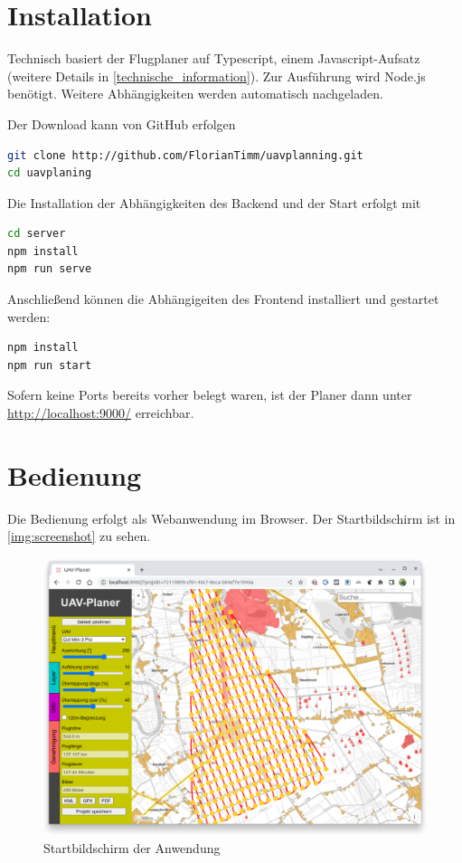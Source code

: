 \documentclass[a4paper,12pt,bibliography=totoc, listof=totoc,titlepage]{scrartcl}
\begin{document}
\section{Installation}
Technisch basiert der Flugplaner auf Typescript, einem Javascript-Aufsatz (weitere Details in \autoref{technische_information}). Zur Ausführung wird Node.js benötigt. Weitere Abhängigkeiten werden automatisch nachgeladen.

Der Download kann von GitHub erfolgen
\begin{lstlisting}[language=bash]
git clone http://github.com/FlorianTimm/uavplanning.git
cd uavplaning
\end{lstlisting}

Die Installation der Abhängigkeiten des Backend und der Start erfolgt mit
\begin{lstlisting}[language=bash]
cd server
npm install
npm run serve
\end{lstlisting}

Anschließend können die Abhängigeiten des Frontend installiert und gestartet werden:
\begin{lstlisting}[language=bash]
npm install
npm run start
\end{lstlisting}

Sofern keine Ports bereits vorher belegt waren, ist der Planer dann unter \url{http://localhost:9000/} erreichbar.

\section{Bedienung}

Die Bedienung erfolgt als Webanwendung im Browser. Der Startbildschirm ist in \autoref{img:screenshot} zu sehen.

\begin{figure} %
 \centering
 \includegraphics[width=1\textwidth]{./img/screenshot.png}
\centering
 \caption{Startbildschirm der Anwendung} %
 \label{img:screenshot} %
\end{figure}
\end{document}
